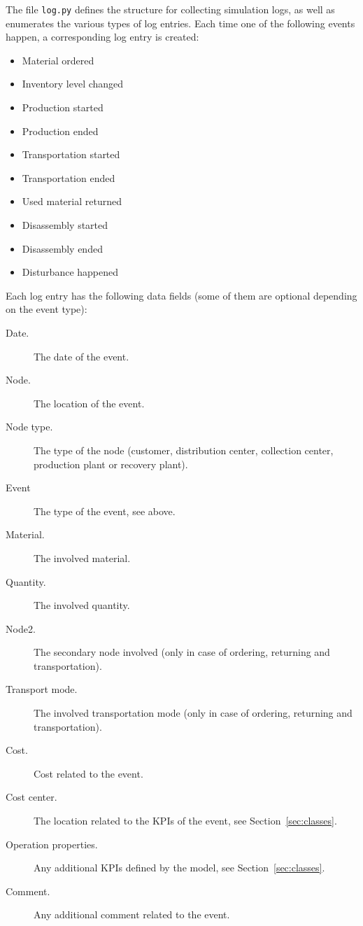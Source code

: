 \documentclass{article}
\begin{document}
The file \texttt{log.py} defines the structure for collecting simulation logs, as well as enumerates the various types of log entries. Each time one of the following events happen, a corresponding log entry is created:

\begin{itemize}
\item Material ordered
\item Inventory level changed
\item Production started
\item Production ended
\item Transportation started
\item Transportation ended
\item Used material returned
\item Disassembly started
\item Disassembly ended
\item Disturbance happened
\end{itemize}

Each log entry has the following data fields (some of them are optional depending on the event type):

\begin{description}
\item[Date.] The date of the event.
\item[Node.] The location of the event.
\item[Node type.] The type of the node (customer, distribution center, collection center, production plant or recovery plant).
\item[Event] The type of the event, see above.
\item[Material.] The involved material.
\item[Quantity.] The involved quantity.
\item[Node2.] The secondary node involved (only in case of ordering, returning and transportation).
\item[Transport mode.] The involved transportation mode (only in case of ordering, returning and transportation).
\item[Cost.] Cost related to the event.
\item[Cost center.] The location related to the KPIs of the event, see Section~\ref{sec:classes}.
\item[Operation properties.] Any additional KPIs defined by the model, see Section~\ref{sec:classes}.
\item[Comment.] Any additional comment related to the event.
\end{description}
\end{document}
